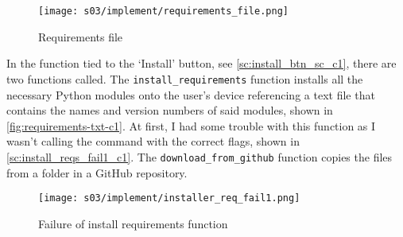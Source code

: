     \begin{figure}[!ht]
        \centering
        \texttt{[image: s03/implement/requirements\_file.png]}
        \caption{Requirements file}
        \label{fig:requirements-txt-c1}
    \end{figure}

    In the function tied to the `Install' button, see \autoref{sc:install_btn_sc_c1}, there are two functions called.
    The \verb|install_requirements| function installs all the necessary Python modules onto the user's device referencing a text file that contains the names and version numbers of said modules, shown in \autoref{fig:requirements-txt-c1}. At first, I had some trouble with this function as I wasn't calling the command with the correct flags, shown in \autoref{sc:install_reqs_fail1_c1}. 
    The \verb|download_from_github| function copies the files from a folder in a GitHub repository. 




    \begin{figure}[!ht]
        \centering
        \texttt{[image: s03/implement/installer\_req\_fail1.png]}
        \caption{Failure of install requirements function}
        \label{fig:install_reqs_fail_pf_c1}
    \end{figure}
    

